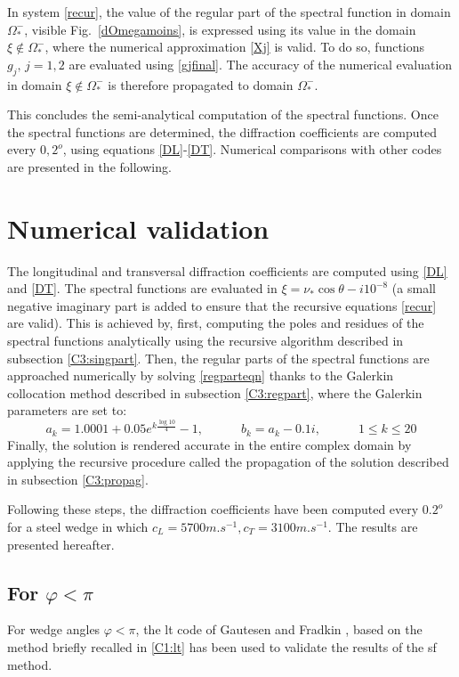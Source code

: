 In system \eqref{recur}, the value of the regular part of the spectral function in domain $\Omega_*^-$, visible Fig.~\ref{dOmegamoins}, is expressed using its value in the domain $\xi \notin \Omega_*^-$, where the numerical approximation \eqref{Xj} is valid. To do so, functions $g_j,\, j=1,2$ are evaluated using \eqref{gjfinal}. The accuracy of the numerical evaluation in domain $\xi \notin \Omega_*^-$ is therefore propagated to domain $\Omega_*^-$. 

This concludes the semi-analytical computation of the spectral functions. Once the spectral functions are determined, the diffraction coefficients are computed every $0,2^o$, using equations \eqref{DL}-\eqref{DT}. Numerical comparisons with other codes are presented in the following.


\section{Numerical validation}
\label{C3:numval}
The longitudinal and transversal diffraction coefficients are computed using \eqref{DL} and \eqref{DT}. The spectral functions are evaluated in $\xi=\nu_*\cos\theta -i10^{-8}$ (a small negative imaginary part is added to ensure that the recursive equations \eqref{recur} are valid). This is achieved by, first, computing the poles and residues of the spectral functions analytically using the recursive algorithm described in subsection \ref{C3:singpart}. Then, the regular parts of the spectral functions are approached numerically by solving \eqref{regparteqn} thanks to the Galerkin collocation method described in subsection \ref{C3:regpart}, where the Galerkin parameters are set to:
\begin{equation}
a_k=1.0001+0.05e^{k\frac{\log 10}{4}}-1, \hspace{3em} b_k=a_k-0.1i, \hspace{3em} 1\leq k\leq20
\end{equation}
Finally, the solution is rendered accurate in the entire complex domain by applying the recursive procedure called the propagation of the solution described in subsection \ref{C3:propag}.

Following these steps, the diffraction coefficients have been computed every $0.2 ^o$ for a steel wedge in which $c_L=5700 m.s^{-1}, c_T=3100 m.s^{-1}$. The results are presented hereafter.
\subsection{For $\varphi<\pi$}
For wedge angles $\varphi<\pi$, the \acrfull{lt} code of Gautesen and Fradkin \cite{GautesenFradkin}, based on the method briefly recalled in \ref{C1:lt} has been used to validate the results of the \acrfull{sf} method. 

